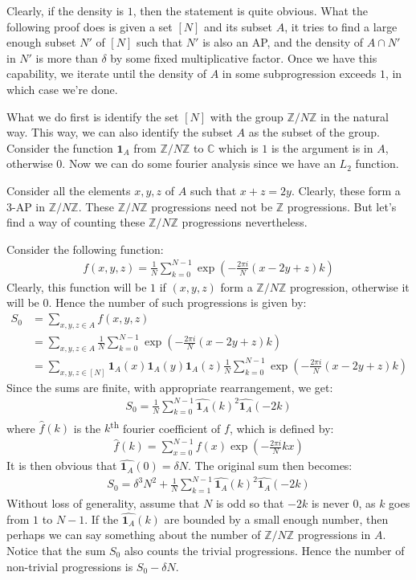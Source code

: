 \documentclass{article}
\newcommand{\integer}{\mathbb{Z}}
\newcommand{\znz}{\mathbb{Z}/N\mathbb{Z}}
\newcommand{\indi}{\mathbf{1}_A}
\begin{document}
Clearly, if the density is $1$, then the statement is quite obvious. What the following proof does is given a set $[N]$ and its subset $A$, it tries to find a large enough subset $N'$ of $[N]$ such that $N'$ is also an AP, and the density of $A \cap N'$ in $N'$ is more than $\delta$ by some fixed multiplicative factor. Once we have this capability, we iterate until the density of $A$ in some subprogression exceeds $1$, in which case we're done.

What we do first is identify the set $[N]$ with the group $\mathbb{Z}/N\mathbb{Z}$ in the natural way. This way, we can also identify the subset $A$ as the subset of the group. Consider the function $\mathbf{1}_A$ from $\mathbb{Z}/N\mathbb{Z}$ to $\mathbb{C}$ which is $1$ is the argument is in $A$, otherwise $0$. Now we can do some fourier analysis since we have an $L_2$ function.

Consider all the elements $x,y,z$ of $A$ such that $x+z = 2y$. Clearly, these form a 3-AP in $\mathbb{Z}/N\mathbb{Z}$. These $\mathbb{Z}/N\mathbb{Z}$ progressions need not be $\integer$ progressions. But let's find a way of counting these $\znz$ progressions nevertheless.

Consider the following function:
\begin{align*}
    f(x,y,z) = \frac{1}{N}\sum_{k=0}^{N-1} \exp\left(-\frac{2\pi i}{N}(x -2y +z)k\right)
\end{align*}
Clearly, this function will be $1$ if $(x,y,z)$ form a $\znz$ progression, otherwise it will be $0$. Hence the number of such progressions is given by:
\begin{align*}
    S_0 &= \sum_{x,y,z \in A}f(x,y,z) \\
    &= \sum_{x,y,z \in A} \frac{1}{N}\sum_{k=0}^{N-1} \exp\left(-\frac{2\pi i}{N}(x -2y +z)k\right) \\
    &= \sum_{x,y,z \in [N]} \indi(x)\indi(y)\indi(z) \frac{1}{N}\sum_{k=0}^{N-1} \exp\left(-\frac{2\pi i}{N}(x -2y +z)k\right)
\end{align*}
Since the sums are finite, with appropriate rearrangement, we get:
\begin{align*}
    S_0 = \frac{1}{N} \sum_{k=0}^{N-1} \widehat{\indi}(k)^2 \widehat{\indi}(-2k)
\end{align*}
where $\widehat{f}(k)$ is the $k$\textsuperscript{th} fourier coefficient of $f$, which is defined by:
\begin{align*}
    \widehat{f}(k) = \sum_{x=0}^{N-1} f(x) \exp\left(-\frac{2\pi i}{N}kx\right)    
\end{align*}
It is then obvious that $\widehat{\indi}(0) = \delta N$. The original sum then becomes:
\begin{align*}
    S_0 = \delta^3 N^2 + \frac{1}{N} \sum_{k=1}^{N-1} \widehat{\indi}(k)^2 \widehat{\indi}(-2k)
\end{align*}
Without loss of generality, assume that $N$ is odd so that $-2k$ is never $0$, as $k$ goes from $1$ to $N-1$. If the $\widehat{\indi}(k)$ are bounded by a small enough number, then perhaps we can say something about the number of $\znz$ progressions in $A$. Notice that the sum $S_0$ also counts the trivial progressions. Hence the number of non-trivial progressions is $S_0 - \delta N$.
\end{document}
